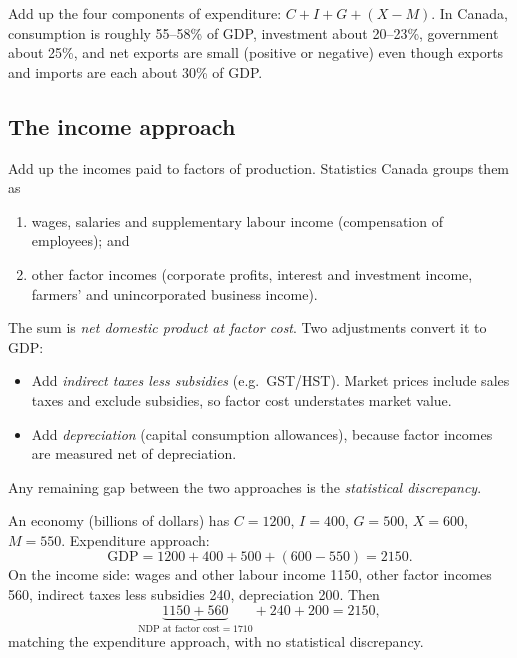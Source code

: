 Add up the four components of expenditure: $C + I + G + (X - M)$. In Canada, consumption
is roughly 55--58\% of GDP, investment about 20--23\%, government about 25\%, and net
exports are small (positive or negative) even though exports and imports are each about
30\% of GDP.

\subsection{The income approach}

Add up the incomes paid to factors of production. Statistics Canada groups them as
\begin{enumerate}
  \item wages, salaries and supplementary labour income (compensation of employees); and
  \item other factor incomes (corporate profits, interest and investment income, farmers'
        and unincorporated business income).
\end{enumerate}
The sum is \emph{net domestic product at factor cost}. Two adjustments convert it to GDP:
\begin{itemize}
  \item Add \emph{indirect taxes less subsidies} (e.g.\ GST/HST). Market prices include
        sales taxes and exclude subsidies, so factor cost understates market value.
  \item Add \emph{depreciation} (capital consumption allowances), because factor incomes
        are measured net of depreciation.
\end{itemize}
Any remaining gap between the two approaches is the \emph{statistical discrepancy}.

\begin{example}
An economy (billions of dollars) has $C = 1200$, $I = 400$, $G = 500$, $X = 600$,
$M = 550$. Expenditure approach:
\[
  \text{GDP} = 1200 + 400 + 500 + (600 - 550) = 2150.
\]
On the income side: wages and other labour income 1150, other factor incomes 560,
indirect taxes less subsidies 240, depreciation 200. Then
\[
  \underbrace{1150 + 560}_{\text{NDP at factor cost} = 1710} + 240 + 200 = 2150,
\]
matching the expenditure approach, with no statistical discrepancy.
\end{example}

